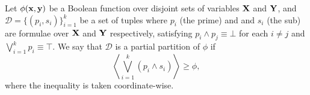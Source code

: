 \begin{definition}\label{def:partialpart}
  Let $\phi(\mathbf{x},\mathbf{y})$ be a Boolean function over disjoint sets of variables $\mathbf{X}$ and
  $\mathbf{Y}$, and $\mathcal{D}=\{(p_i,s_i)\}_{i=1}^k$ be a set of tuples where $p_i$ (the prime) and
  and $s_i$ (the sub) are formulae over $\mathbf{X}$ and $\mathbf{Y}$ respectively, satisfying $p_i\wedge
  p_j\equiv\bot$ for each $i\neq j$ and $\bigvee_{i=1}^k p_i\equiv\top$. We say that $\mathcal{D}$
  is a partial partition of $\phi$ if
  \begin{equation*}
    \left\langle\bigvee_{i=1}^k (p_i\wedge s_i)\right\rangle\geq\phi,
  \end{equation*}
  where the inequality is taken coordinate-wise.
\end{definition}

